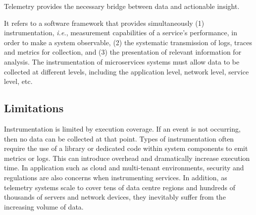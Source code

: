 Telemetry provides the necessary bridge between data and actionable insight.

It refers to a software framework that provides simultaneously (1) instrumentation, \emph{i.e.}, measurement capabilities of a service's performance, in order to make a system observable, (2) the systematic transmission of logs, traces and metrics for collection, and (3) the presentation of relevant information for analysis. The instrumentation of microservices systems must allow data to be collected at different levels, including the application level, network level, service level, etc.

\subsection{Limitations}

Instrumentation is limited by execution coverage. If an event is not occurring, then no data can be collected at that point. Types of instrumentation often require the use of a library or dedicated code within system components to emit metrics or logs. This can introduce overhead and dramatically increase execution time. In application such as cloud and multi-tenant environments, security and regulations are also concerns when instrumenting services. In addition, as telemetry systems scale to cover tens of data centre regions and hundreds of thousands of servers and network devices, they inevitably suffer from the increasing volume of data.
